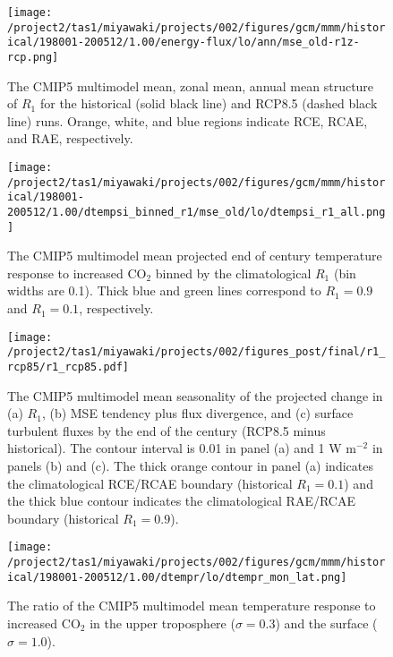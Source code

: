 \documentclass{ametsocV5}
\begin{document}
\begin{figure}
  \centering
  \noindent\texttt{[image: /project2/tas1/miyawaki/projects/002/figures/gcm/mmm/historical/198001-200512/1.00/energy-flux/lo/ann/mse\_old-r1z-rcp.png]}
  \caption{The CMIP5 multimodel mean, zonal mean, annual mean structure of $R_1$ for the historical (solid black line) and RCP8.5 (dashed black line) runs. Orange, white, and blue regions indicate RCE, RCAE, and RAE, respectively.}
  \label{fig:cmip5-r1-ann-rcp}
\end{figure}

\begin{figure}
  \centering
  \noindent\texttt{[image: /project2/tas1/miyawaki/projects/002/figures/gcm/mmm/historical/198001-200512/1.00/dtempsi\_binned\_r1/mse\_old/lo/dtempsi\_r1\_all.png]}
  \caption{The CMIP5 multimodel mean projected end of century temperature response to increased CO$_2$ binned by the climatological $R_{1}$ (bin widths are 0.1). Thick blue and green lines correspond to $R_1=0.9$ and $R_1=0.1$, respectively.}
  \label{fig:cmip5-dtemp-binned-r1}
\end{figure}

\begin{figure}
  \centering
  \noindent\texttt{[image: /project2/tas1/miyawaki/projects/002/figures\_post/final/r1\_rcp85/r1\_rcp85.pdf]}\\
  \caption{The CMIP5 multimodel mean seasonality of the projected change in (a) $R_1$, (b) MSE tendency plus flux divergence, and (c) surface turbulent fluxes by the end of the century (RCP8.5 minus historical). The contour interval is 0.01 in panel (a) and 1 W m$^{-2}$ in panels (b) and (c). The thick orange contour in panel (a) indicates the climatological RCE/RCAE boundary (historical $R_1=0.1$) and the thick blue contour indicates the climatological RAE/RCAE boundary (historical $R_1=0.9$).}
  \label{fig:cmip5-dr1}
\end{figure}

\begin{figure}
  \centering
  \noindent\texttt{[image: /project2/tas1/miyawaki/projects/002/figures/gcm/mmm/historical/198001-200512/1.00/dtempr/lo/dtempr\_mon\_lat.png]}
  \caption{The ratio of the CMIP5 multimodel mean temperature response to increased CO$_2$ in the upper troposphere ($\sigma=0.3$) and the surface ($\sigma=1.0$).}
  \label{fig:cmip5-dtemp}
\end{figure}
\end{document}
